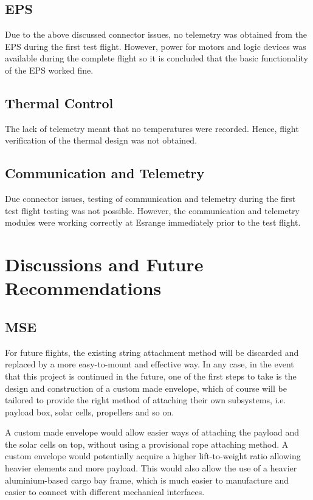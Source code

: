 \subsection{EPS}
Due to the above discussed connector issues, no telemetry was obtained from the \ac{EPS} during the first test flight. However, power for motors and logic devices was available during the complete flight so it is concluded that the basic functionality of the \ac{EPS} worked fine. 

\subsection{Thermal Control}
The lack of telemetry meant that no temperatures were recorded. Hence, flight verification of the thermal design was not obtained.

\subsection{Communication and Telemetry}

Due connector issues, testing of communication and telemetry during the first test flight testing was not possible. However, the communication and telemetry modules were working correctly at Esrange immediately prior to the test flight.

\section{Discussions and Future Recommendations}
%
\subsection{MSE}
For future flights, the existing string attachment method will be discarded and replaced by a more easy-to-mount and effective way. In any case, in the event that this project is continued in the future, one of the first steps to take is the design and construction of a custom made envelope, which of course will be tailored to provide the right method of attaching their own subsystems, i.e. payload box, solar cells, propellers and so on. 

A custom made envelope would allow easier ways of attaching the payload and the solar cells on top, without using a provisional rope attaching method. A custom envelope would potentially acquire a higher lift-to-weight ratio allowing heavier elements and more payload. This would also allow the use of a heavier aluminium-based cargo bay frame, which is much easier to manufacture and easier to connect with different mechanical interfaces.


